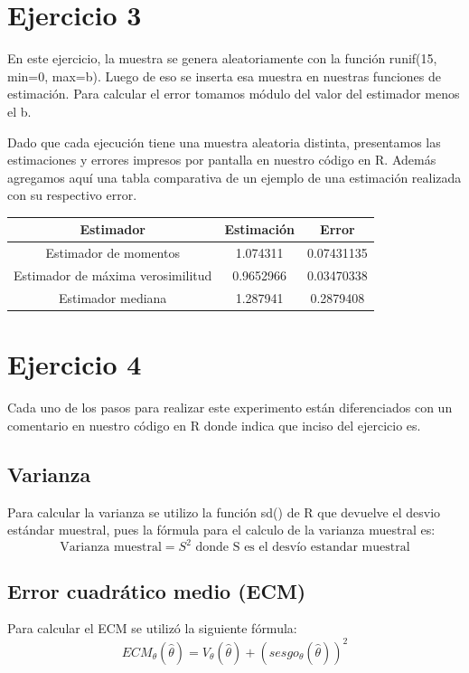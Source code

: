 \documentclass[a4paper]{article}
\begin{document}
\section{Ejercicio 3}
En este ejercicio, la muestra se genera aleatoriamente con la función runif(15, min=0, max=b). Luego de eso se inserta esa muestra en nuestras funciones de estimación.
Para calcular el error tomamos módulo del valor del estimador menos el b. 

Dado que cada ejecución tiene una muestra aleatoria distinta, presentamos las estimaciones y errores impresos por pantalla en nuestro código en R. Además agregamos aquí una tabla comparativa de un ejemplo de una estimación realizada con su respectivo error. 

\begin{center}
 \begin{tabular}{||c | c | c||} 
 \hline
 Estimador & Estimación  & Error \\ [0.5ex] 
 \hline\hline
 Estimador de momentos & 1.074311 & 0.07431135 \\ 
 \hline
 Estimador de máxima verosimilitud & 0.9652966 & 0.03470338 \\
 \hline
 Estimador mediana & 1.287941 & 0.2879408 \\ [1ex] 
 \hline
\end{tabular}
\end{center}

\section{Ejercicio 4}
Cada uno de los pasos para realizar este experimento están diferenciados con un comentario en nuestro código en R donde indica que inciso del ejercicio es.
\subsection{Varianza}
Para calcular la varianza se utilizo la función sd() de R que devuelve el desvio estándar muestral, pues la fórmula para el calculo de la varianza muestral es:
\[
\textrm{Varianza muestral} = S^2 \textrm{ donde S es el desvío estandar muestral}
\]
\subsection{Error cuadrático medio (ECM)}
Para calcular el ECM se utilizó la siguiente fórmula:
\[
ECM_\theta(\hat{\theta}) = V_\theta(\hat{\theta}) + (sesgo_\theta(\hat{\theta}))^2
\]
\end{document}
